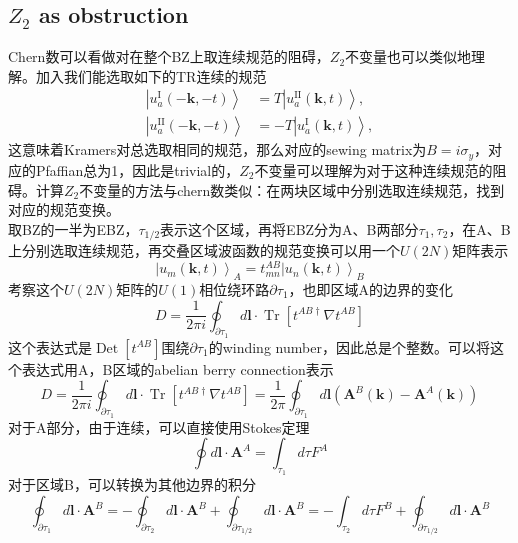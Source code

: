 \documentclass[10pt,openany]{book}
\theoremstyle{thmstyle} %
\theoremstyle{defstyle} %
\theoremstyle{prostyle} %
\begin{document}
\subsection{$ Z_2 $ as obstruction }
Chern数可以看做对在整个BZ上取连续规范的阻碍，$ Z_2 $不变量也可以类似地理解。加入我们能选取如下的TR连续的规范
\begin{equation}
  \begin{aligned}
    \left|u_a^{\mathrm{I}}(-\mathbf{k},-t)\right\rangle & =T\left|u_a^{\mathrm{II}}(\mathbf{k}, t)\right\rangle, \\
    \left|u_a^{\mathrm{II}}(-\mathbf{k},-t)\right\rangle & =-T\left|u_a^{\mathrm{I}}(\mathbf{k}, t)\right\rangle,
    \end{aligned}
\end{equation} 
这意味着Kramers对总选取相同的规范，那么对应的sewing matrix为$ B=i \sigma_y $，对应的Pfaffian总为1，因此是trivial的，$ Z_2 $不变量可以理解为对于这种连续规范的阻碍。计算$ Z_2 $不变量的方法与chern数类似：在两块区域中分别选取连续规范，找到对应的规范变换。\\
取BZ的一半为EBZ，$ \tau_{1 / 2} $表示这个区域，再将EBZ分为A、B两部分$ \tau_1,\tau_2 $，在A、B上分别选取连续规范，再交叠区域波函数的规范变换可以用一个$ U(2N) $矩阵表示
\begin{equation}
  \left|u_m(\mathbf{k}, t)\right\rangle_A=t_{m n}^{A B}\left|u_n(\mathbf{k}, t)\right\rangle_B
\end{equation} 
考察这个$ U(2N) $矩阵的$ U(1) $相位绕环路$ \partial \tau_1 $，也即区域A的边界的变化
\begin{equation}
  D=\frac{1}{2 \pi i} \oint_{\partial \tau_1} d \mathbf{l} \cdot \operatorname{Tr}\left[t^{A B \dagger} \nabla t^{A B}\right]
\end{equation}  
这个表达式是$ \operatorname{Det}\left[t^{A B}\right] $围绕$ \partial \tau_1 $的winding number，因此总是个整数。可以将这个表达式用A，B区域的abelian berry connection表示
\begin{equation}
  D=\frac{1}{2 \pi i} \oint_{\partial \tau_1} d \mathbf{l} \cdot \operatorname{Tr}\left[t^{A B \dagger} \nabla t^{A B}\right]=\frac{1}{2 \pi} \oint_{\partial \tau_1} d \mathbf{l}\left(\mathbf{A}^B(\mathbf{k})-\mathbf{A}^A(\mathbf{k})\right)
\end{equation}
对于A部分，由于连续，可以直接使用Stokes定理
\begin{equation*}
  \oint d \mathbf{l} \cdot \mathbf{A}^A=\int_{\tau_1} d \tau F^A
\end{equation*}
对于区域B，可以转换为其他边界的积分
\begin{equation*}
  \oint_{\partial \tau_1} d \mathbf{l} \cdot \mathbf{A}^B=-\oint_{\partial \tau_2} d \mathbf{l} \cdot \mathbf{A}^B+\oint_{\partial \tau_{1 / 2}} d \mathbf{l} \cdot \mathbf{A}^B=-\int_{\tau_2} d \tau F^B+\oint_{\partial \tau_{1 / 2}} d \mathbf{l} \cdot \mathbf{A}^B
\end{equation*}
\end{document}
